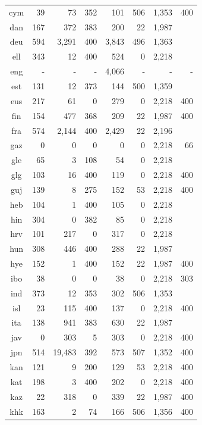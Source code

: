 \begin{table}[!htb]
\begin{minipage}[t]{0.45\textwidth}
\begin{tabular}{@{}crrrrrrr@{}}
        cym & 39 & 73 & 352 & 101 & 506 & 1,353 & 400 \\
        dan & 167 & 372 & 383 & 200 & 22 & 1,987 &  \\
        deu & 594 & 3,291 & 400 & 3,843 & 496 & 1,363 &  \\
        ell & 343 & 12 & 400 & 524 & 0 & 2,218 &  \\
        eng & - & - & - & 4,066 & - & - & - \\
        est & 131 & 12 & 373 & 144 & 500 & 1,359 &  \\
        eus & 217 & 61 & 0 & 279 & 0 & 2,218 & 400 \\
        fin & 154 & 477 & 368 & 209 & 22 & 1,987 & 400 \\
        fra & 574 & 2,144 & 400 & 2,429 & 22 & 2,196 &  \\
        gaz &  0  & 0     &  0  & 0     & 0 & 2,218 & 66 \\
        gle & 65 & 3 & 108 & 54 & 0 & 2,218 &  \\
        glg & 103 & 16 & 400 & 119 & 0 & 2,218 & 400 \\
        guj & 139 & 8 & 275 & 152 & 53 & 2,218 & 400 \\
        heb & 104 & 1 & 400 & 105 & 0 & 2,218 &  \\
        hin & 304 & 0 & 382 & 85 & 0 & 2,218 &  \\
        hrv & 101 & 217 & 0 & 317 & 0 & 2,218 &  \\
        hun & 308 & 446 & 400 & 288 & 22 & 1,987 &  \\
        hye & 152 & 1 & 400 & 152 & 22 & 1,987 & 400 \\
        ibo & 38 &  0 & 0 & 38 & 0 & 2,218 & 303 \\
        ind & 373 & 12 & 353 & 302 & 506 & 1,353 &  \\
        isl & 23 & 115 & 400 & 137 & 0 & 2,218 & 400 \\
        ita & 138 & 941 & 383 & 630 & 22 & 1,987 &  \\
        jav & 0 & 303 & 5 & 303 & 0 & 2,218 & 400 \\
        jpn & 514 & 19,483 & 392 & 573 & 507 & 1,352 & 400 \\
        kan & 121 & 9 & 200 & 129 & 53 & 2,218 & 400 \\
        kat & 198 & 3 & 400 & 202 & 0 & 2,218 & 400 \\
        kaz & 22 & 318 & 0 & 339 & 22 & 1,987 & 400 \\
        khk & 163 & 2 & 74 & 166 & 506 & 1,356 & 400 \\

\end{tabular}
\end{minipage}
\end{table}
